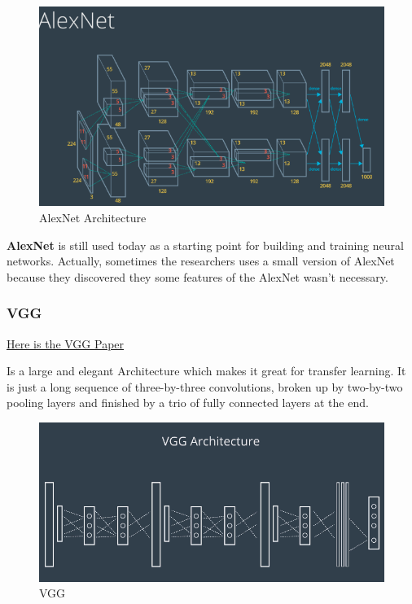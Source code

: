 \documentclass[11pt, a4paper]{article}
\begin{document}
\begin{figure}[htpb!]
	\centering
	\includegraphics[width=0.8\linewidth]{alexnet}
	\caption{AlexNet Architecture}
	\label{fig:alexnet}
\end{figure}



\textbf{AlexNet} is still used today as a starting point for building and training neural networks. Actually, sometimes the researchers uses a small version of AlexNet because they discovered they some features of the AlexNet wasn't necessary. 





\subsubsection{VGG}%
\label{ssub:vgg}



\href{https://arxiv.org/pdf/1409.1556.pdf}{Here is the VGG Paper}


Is a large and elegant Architecture which makes it great for transfer learning. It is just a long sequence of three-by-three convolutions, broken up by two-by-two pooling layers and finished by a trio of fully connected layers at the end. 


\begin{figure}[htpb!]
	\centering
	\includegraphics[width=0.8\linewidth]{vgg}
	\caption{VGG}
	\label{fig:vgg}
\end{figure}
\end{document}
